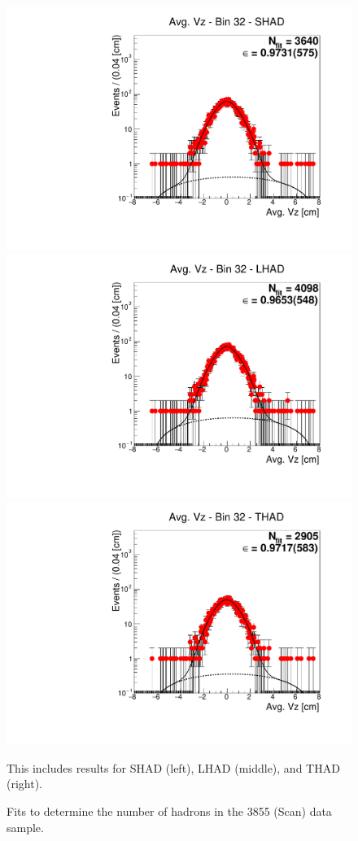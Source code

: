 \begin{figure}[H]
\centering
\includegraphics[scale=0.25]{figures/plots/nonDDbar_fit_results/scan/fit_scan_32_data_SHAD.pdf}
\hspace{-0.5cm}
\includegraphics[scale=0.25]{figures/plots/nonDDbar_fit_results/scan/fit_scan_32_data_LHAD.pdf}
\hspace{-0.5cm}
\includegraphics[scale=0.25]{figures/plots/nonDDbar_fit_results/scan/fit_scan_32_data_THAD.pdf}
\caption{Fits to determine the number of hadrons in the 3855 (Scan) data sample.}
{This includes results for SHAD (left), LHAD (middle), and THAD (right).}
\label{fig:hadron_fits_scan_32}
\end{figure}

